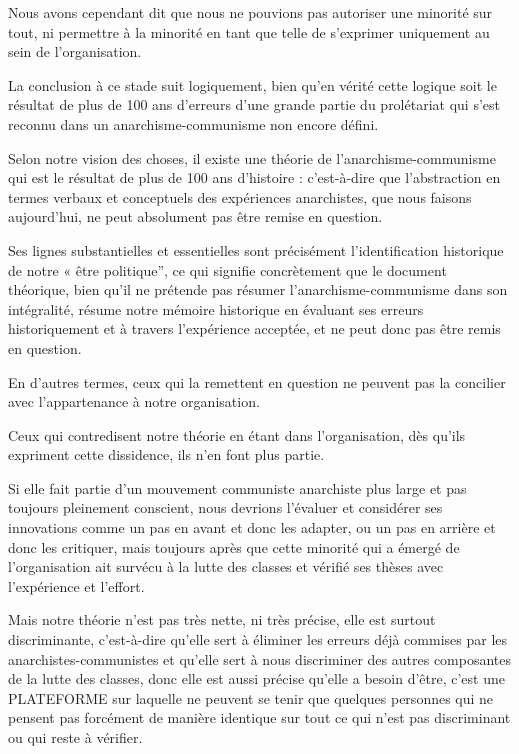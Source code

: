 Nous avons cependant dit que nous ne pouvions pas autoriser une minorité sur tout, ni permettre à la minorité en tant que telle de s'exprimer uniquement au sein de l'organisation.

La conclusion à ce stade suit logiquement, bien qu'en vérité cette logique soit le résultat de plus de 100 ans d'erreurs d'une grande partie du prolétariat qui s'est reconnu dans un anarchisme-communisme non encore défini.

Selon notre vision des choses, il existe une théorie de l'anarchisme-communisme qui est le résultat de plus de 100 ans d'histoire : c'est-à-dire que l'abstraction en termes verbaux et conceptuels des expériences anarchistes, que nous faisons aujourd'hui, ne peut absolument pas être remise en question.

Ses lignes substantielles et essentielles sont précisément l'identification historique de notre « être politique'', ce qui signifie concrètement que le document théorique, bien qu'il ne prétende pas résumer l'anarchisme-communisme dans son intégralité, résume notre mémoire historique en évaluant ses erreurs historiquement et à travers l'expérience acceptée, et ne peut donc pas être remis en question.

En d'autres termes, ceux qui la remettent en question ne peuvent pas la concilier avec l'appartenance à notre organisation.

Ceux qui contredisent notre théorie en étant dans l'organisation, dès qu'ils expriment cette dissidence, ils n'en font plus partie.

Si elle fait partie d'un mouvement communiste anarchiste plus large et pas toujours pleinement conscient, nous devrions l'évaluer et considérer ses innovations comme un pas en avant et donc les adapter, ou un pas en arrière et donc les critiquer, mais toujours après que cette minorité qui a émergé de l'organisation ait survécu à la lutte des classes et vérifié ses thèses avec l'expérience et l'effort.

Mais notre théorie n'est pas très nette, ni très précise, elle est surtout discriminante, c'est-à-dire qu'elle sert à éliminer les erreurs déjà commises par les anarchistes-communistes et qu'elle sert à nous discriminer des autres composantes de la lutte des classes, donc elle est aussi précise qu'elle a besoin d'être, c'est une PLATEFORME sur laquelle ne peuvent se tenir que quelques personnes qui ne pensent pas forcément de manière identique sur tout ce qui n'est pas discriminant ou qui reste à vérifier.

